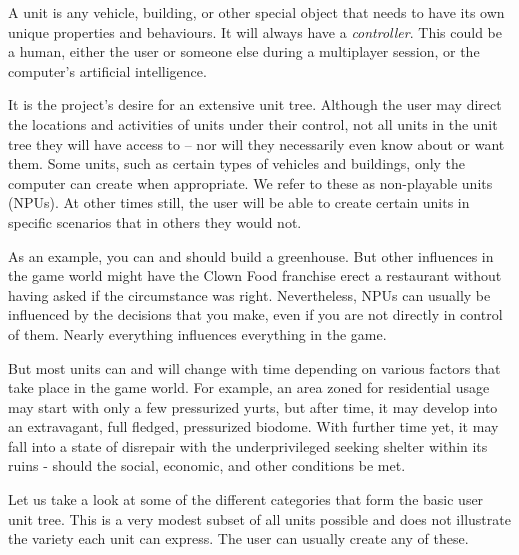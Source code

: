 

A unit is any vehicle, building, or other special object that needs to have its own unique properties and behaviours. It will always have a {\it controller}. This could be a human, either the user or someone else during a multiplayer session, or the computer's artificial intelligence.

It is the project's desire for an extensive unit tree. Although the user may direct the locations and activities of units under their control, not all units in the unit tree they will have access to -- nor will they necessarily even know about or want them. Some units, such as certain types of vehicles and buildings, only the computer can create when appropriate. We refer to these as non-playable units (NPUs). At other times still, the user will be able to create certain units in specific scenarios that in others they would not.

As an example, you can and should build a greenhouse. But other influences in the game world might have the Clown Food franchise erect a restaurant without having asked if the circumstance was right. Nevertheless, NPUs can usually be influenced by the decisions that you make, even if you are not directly in control of them. Nearly everything influences everything in the game.

But most units can and will change with time depending on various factors that take place in the game world. For example, an area zoned for residential usage may start with only a few pressurized yurts, but after time, it may develop into an extravagant, full fledged, pressurized biodome. With further time yet, it may fall into a state of disrepair with the underprivileged seeking shelter within its ruins - should the social, economic, and other conditions be met.

    {}

Let us take a look at some of the different categories that form the basic user unit tree. This is a very modest subset of all units possible and does not illustrate the variety each unit can express. The user can usually create any of these. 

